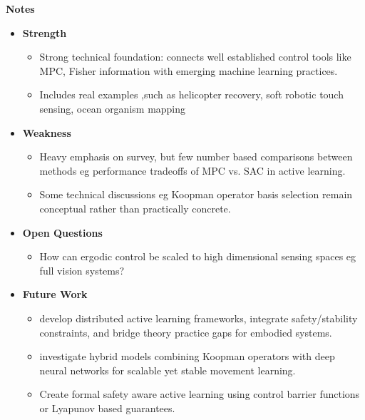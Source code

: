 \documentclass[report.tex]{subfiles}
\begin{document}
\noindent\textbf{Notes}
\begin{itemize}
    \item \noindent\textbf {Strength}
    \begin{itemize}
        \item Strong technical foundation: connects well established control tools like MPC, Fisher information  with emerging machine learning practices. 
        \item Includes real examples ,such as  helicopter recovery, soft robotic touch sensing, ocean organism mapping

       

    \end{itemize}
    
    \item \noindent\textbf{Weakness}
    \begin{itemize}
        \item Heavy emphasis on survey, but few number based comparisons between methods eg  performance tradeoffs of MPC vs. SAC in active learning. 
        \item Some technical discussions eg  Koopman operator basis selection remain conceptual rather than practically concrete. 
    \end{itemize}
\end{itemize}

\begin{itemize}
    \item \noindent\textbf {Open Questions}
    \begin{itemize}
        \item     How can ergodic control be scaled to high dimensional sensing spaces eg  full vision systems? 


    \end{itemize}
    
    \item \noindent\textbf{Future Work}
    \begin{itemize}
        \item develop distributed active learning frameworks, integrate safety/stability constraints, and bridge theory practice gaps for embodied systems. 
        \item investigate hybrid models combining Koopman operators with deep neural networks for scalable yet stable movement learning. 
        \item Create formal safety aware active learning using control barrier functions or Lyapunov based guarantees. 
        
    \end{itemize}
\end{itemize}
\end{document}
